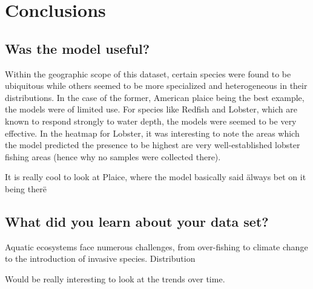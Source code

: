 \section{Conclusions}

\subsection{Was the model useful?}

Within the geographic scope of this dataset, certain species were found to be ubiquitous while others seemed to be more specialized and heterogeneous in their distributions.
In the case of the former, American plaice being the best example, the models were of limited use.
For species like Redfish and Lobster, which are known to respond strongly to water depth, the models were seemed to be very effective.
In the heatmap for Lobster, it was interesting to note the areas which the model predicted the presence to be highest are
very well-established lobster fishing areas (hence why no samples were collected there).


It is really cool to look at Plaice, where the model basically said \"always bet on it being there\"


\subsection{What did you learn about your data set?}

Aquatic ecosystems face numerous challenges, from over-fishing to climate change to the introduction of invasive species.
Distribution



Would be really interesting to look at the trends over time.